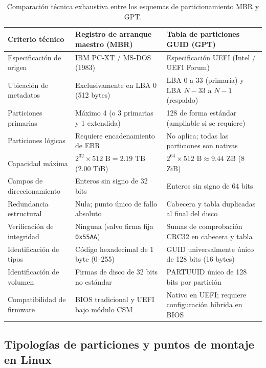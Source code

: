 \documentclass[12pt]{article}
\begin{document}
\begin{table}[H]
\centering
\small
\caption{Comparación técnica exhaustiva entre los esquemas de particionamiento MBR y GPT.}
\label{tab:comparativaMbrGpt}
\begin{tabularx}{\textwidth}{lXX}
\toprule
\textbf{Criterio técnico} & \textbf{Registro de arranque maestro (MBR)} & \textbf{Tabla de particiones GUID (GPT)} \\
\midrule
Especificación de origen & IBM PC-XT / MS-DOS (1983) & Especificación UEFI (Intel / UEFI Forum) \\
Ubicación de metadatos & Exclusivamente en LBA 0 (512 bytes) & LBA 0 a 33 (primaria) y LBA $N-33$ a $N-1$ (respaldo) \\
Particiones primarias & Máximo 4 (o 3 primarias y 1 extendida) & 128 de forma estándar (ampliable si se requiere) \\
Particiones lógicas & Requiere encadenamiento de EBR & No aplica; todas las particiones son nativas \\
Capacidad máxima & $2^{32} \times 512\text{ B} = 2.19\text{ TB}$ (2.00 TiB) & $2^{64} \times 512\text{ B} \approx 9.44\text{ ZB}$ (8 ZiB) \\
Campos de direccionamiento & Enteros sin signo de 32 bits & Enteros sin signo de 64 bits \\
Redundancia estructural & Nula; punto único de fallo absoluto & Cabecera y tabla duplicadas al final del disco \\
Verificación de integridad & Ninguna (salvo firma fija \texttt{0x55AA}) & Sumas de comprobación CRC32 en cabecera y tabla \\
Identificación de tipos & Código hexadecimal de 1 byte (0--255) & GUID universalmente único de 128 bits (16 bytes) \\
Identificación de volumen & Firmas de disco de 32 bits no estándar & PARTUUID único de 128 bits por partición \\
Compatibilidad de firmware & BIOS tradicional y UEFI bajo módulo CSM & Nativo en UEFI; requiere configuración híbrida en BIOS \\
\bottomrule
\end{tabularx}
\end{table}

\subsection{Tipologías de particiones y puntos de montaje en Linux}
\label{sec:tipologiasParticiones}
\end{document}
